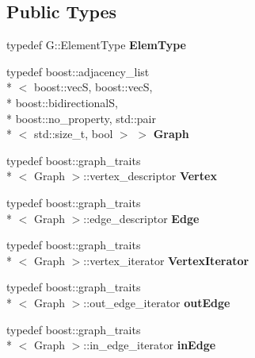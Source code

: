 \subsection*{Public Types}
\begin{DoxyCompactItemize}
\item 
\hypertarget{classcCayleyGrf_a96e2347884f970817ad4f941ff85f478}{typedef G\-::\-Element\-Type {\bfseries Elem\-Type}}\label{classcCayleyGrf_a96e2347884f970817ad4f941ff85f478}

\item 
\hypertarget{classcCayleyGrf_a431bdfe2bfca2f3663f4258b648d702f}{typedef boost\-::adjacency\-\_\-list\\*
$<$ boost\-::vec\-S, boost\-::vec\-S, \\*
boost\-::bidirectional\-S, \\*
boost\-::no\-\_\-property, std\-::pair\\*
$<$ std\-::size\-\_\-t, bool $>$ $>$ {\bfseries Graph}}\label{classcCayleyGrf_a431bdfe2bfca2f3663f4258b648d702f}

\item 
\hypertarget{classcCayleyGrf_a1ef27f6e825137691b820322094745b3}{typedef boost\-::graph\-\_\-traits\\*
$<$ Graph $>$\-::vertex\-\_\-descriptor {\bfseries Vertex}}\label{classcCayleyGrf_a1ef27f6e825137691b820322094745b3}

\item 
\hypertarget{classcCayleyGrf_abade7422415758e7d2699ccfa052accb}{typedef boost\-::graph\-\_\-traits\\*
$<$ Graph $>$\-::edge\-\_\-descriptor {\bfseries Edge}}\label{classcCayleyGrf_abade7422415758e7d2699ccfa052accb}

\item 
\hypertarget{classcCayleyGrf_a8a2a9d7e45de509f97daf663b6827496}{typedef boost\-::graph\-\_\-traits\\*
$<$ Graph $>$\-::vertex\-\_\-iterator {\bfseries Vertex\-Iterator}}\label{classcCayleyGrf_a8a2a9d7e45de509f97daf663b6827496}

\item 
\hypertarget{classcCayleyGrf_a1430d999d3cc6eb645211d8b8d4fed50}{typedef boost\-::graph\-\_\-traits\\*
$<$ Graph $>$\-::out\-\_\-edge\-\_\-iterator {\bfseries out\-Edge}}\label{classcCayleyGrf_a1430d999d3cc6eb645211d8b8d4fed50}

\item 
\hypertarget{classcCayleyGrf_adcb19c46bdccc19e48230b671c97f6f9}{typedef boost\-::graph\-\_\-traits\\*
$<$ Graph $>$\-::in\-\_\-edge\-\_\-iterator {\bfseries in\-Edge}}\label{classcCayleyGrf_adcb19c46bdccc19e48230b671c97f6f9}

\end{DoxyCompactItemize}
